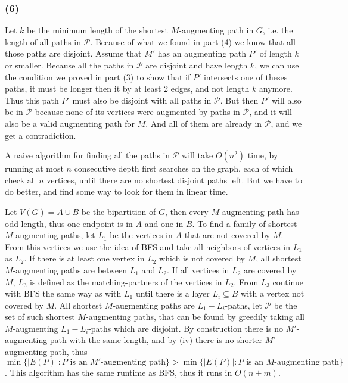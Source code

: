 \documentclass{article}
\begin{document}
 \subsubsection*{(6)} Let $k$ be the minimum length of the shortest $M$-augmenting path in $G$, i.e. the length of all paths in $\mathcal{P}$. Because of what we found in part (4) we know that all those paths are disjoint.
 Assume that $M'$ has an augmenting path $P'$ of length $k$ or smaller. Because all the paths in $\mathcal{P}$ are disjoint and have length $k$, we can use the condition we proved in part (3) to show that if $P'$ intersects one of theses paths, it must be longer then it by at least 2 edges, and not length $k$ anymore. Thus this path $P'$ must also be disjoint with all paths in $\mathcal{P}$.
 But then $P'$ will also be in $\mathcal{P}$ because none of its vertices were augmented by paths in $\mathcal{P}$, and it will also be a valid augmenting path for $M$. And all of them are already in $\mathcal{P}$, and we get a contradiction.

 A naive algorithm for finding all the paths in $\mathcal{P}$ will take $O(n^2)$ time, by running at most $n$ consecutive depth first searches on the graph, each of which check all $n$ vertices, until there are no shortest disjoint paths left. But we have to do better, and find some way to look for them in linear time.


 Let $V(G)=A\cup B$ be the bipartition of $G$, then every $M$-augmenting path has odd length, thus one endpoint is in $A$ and one in $B$. To find a family of shortest $M$-augmenting paths, let $L_1$ be the vertices in $A$ that are not covered by $M$. From this vertices we use the idea of BFS and take all neighbors of vertices in $L_1$ as $L_2$. If there is at least one vertex in $L_2$ which is not covered by $M$, all shortest $M$-augmenting paths are between $L_1$ and $L_2$. If all vertices in $L_2$ are covered by $M$, $L_3$ is defined as the matching-partners of the vertices in $L_2$. From $L_3$ continue with BFS the same way as with $L_1$ until there is a layer $L_i\subseteq B $ with a vertex not covered by $M$. All shortest $M$-augmenting paths are $L_1-L_i$-paths, let $\mathcal{P}$ be the set of such shortest $M$-augmenting paths, that can be found by greedily taking all $M$-augmenting $L_1-L_i$-paths which are disjoint.
 By construction there is no $M'$-augmenting path with the same length, and by (iv) there is no shorter $M'$-augmenting path, thus $\min\{|E(P)|:P \text{ is an $M'$-augmenting path}\}>\min\{|E(P)|:P \text{ is an $M$-augmenting path}\}$. This algorithm has the same runtime as BFS, thus it runs in $O(n+m)$.
\end{document}
